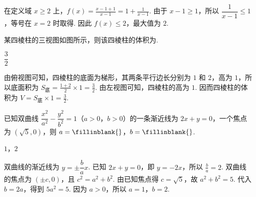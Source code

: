 \begin{solution}
在定义域 \(x\geq2\) 上，\(f(x)=\frac{x-1+1}{x-1}=1+\frac1{x-1}\).
由于 \(x-1\geq1\)，所以 \(\dfrac1{x-1}\leq1\)，等号在 \(x=2\) 时取得. 因此 \(f(x)\leq2\)，最大值为 \(2\).
\end{solution}

\begin{problem}
某四棱柱的三视图如图所示，则该四棱柱的体积为\fillinblank{}.

\end{problem}

\begin{answer}
\(\dfrac{3}{2}\)
\end{answer}

\begin{solution}
由俯视图可知，四棱柱的底面为梯形，其两条平行边长分别为 \(1\) 和 \(2\)，高为 \(1\)，所以底面积为 \(S_{\text{底}}=\frac{1+2}{2}\times1=\frac32\). 由左视图可知，四棱柱的高为 \(1\). 因而四棱柱的体积为 \(V=S_{\text{底}}\times1=\frac32\).
\end{solution}

\begin{problem}
已知双曲线 \(\dfrac{x^2}{a^2}-\dfrac{y^2}{b^2}=1\)（\(a>0\)，\(b>0\)）的一条渐近线为 \(2x+y=0\)，一个焦点为 \((\sqrt5,0)\)，则 \(a=\fillinblank{}\)，\(b=\fillinblank{}\).
\end{problem}

\begin{answer}
\(1\)，\(2\)
\end{answer}

\begin{solution}
双曲线的渐近线为 \(y=\pm\dfrac ba x\). 已知 \(2x+y=0\)，即 \(y=-2x\)，所以 \(\frac ba=2\). 双曲线的焦点为 \((\pm c,0)\)，且 \(c^2=a^2+b^2\). 由已知焦点得 \(c=\sqrt5\)，故 \(a^2+b^2=5\).
代入 \(b=2a\)，得到 \(5a^2=5\). 因为 \(a>0\)，所以 \(a=1\)，\(b=2\).
\end{solution}

